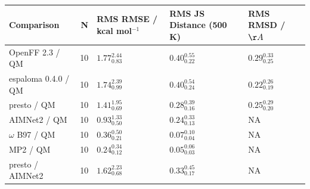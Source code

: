 \begin{tabular}{lrlll}
\toprule
Comparison & N & RMS RMSE / kcal mol$^{-1}$ & RMS JS Distance (500 K) & RMS RMSD / $\AA$ \\
\midrule
OpenFF 2.3 / QM & 10 & $1.77_{0.83}^{2.44}$ & $0.40_{0.22}^{0.55}$ & $0.29_{0.25}^{0.33}$ \\
espaloma 0.4.0 / QM & 10 & $1.74_{0.99}^{2.39}$ & $0.40_{0.24}^{0.54}$ & $0.22_{0.19}^{0.26}$ \\
presto / QM & 10 & $1.41_{0.69}^{1.95}$ & $0.28_{0.16}^{0.39}$ & $0.25_{0.20}^{0.29}$ \\
AIMNet2 / QM & 10 & $0.93_{0.50}^{1.33}$ & $0.24_{0.13}^{0.33}$ & NA \\
$\omega$ B97 / QM & 10 & $0.36_{0.21}^{0.50}$ & $0.07_{0.04}^{0.10}$ & NA \\
MP2 / QM & 10 & $0.24_{0.12}^{0.34}$ & $0.05_{0.03}^{0.06}$ & NA \\
presto / AIMNet2 & 10 & $1.62_{0.68}^{2.23}$ & $0.33_{0.17}^{0.45}$ & NA \\
\bottomrule
\end{tabular}
